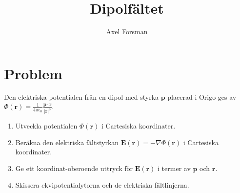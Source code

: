 \documentclass{article}
\author{Axel Forsman}
\title{Dipolfältet}
\renewcommand{\vec}[1]{\mathbf{#1}}
\begin{document}
\maketitle

\section*{Problem}
Den elektriska potentialen från en dipol med styrka $\vec{p}$ placerad i Origo ges av
$ \Phi(\vec r) = \frac1{4\pi\epsilon_0} \frac{\vec p \cdot \vec r}{\lvert \vec r \rvert^3} $.

\begin{enumerate}
	\item Utveckla potentialen $\Phi(\vec r)$ i Cartesiska koordinater.
	\item Beräkna den elektriska fältstyrkan $\vec E(\vec r) = -\nabla \Phi(\vec r)$ i Cartesiska koordinater.
	\item Ge ett koordinat-oberoende uttryck för $\vec E(\vec r)$ i termer av
		$\vec p$ och $\vec r$.
	\item Skissera ekvipotentialytorna och de elektriska fältlinjerna.
\end{enumerate}
\end{document}
